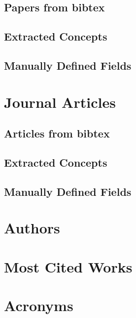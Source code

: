 \documentclass[a4paper]{article}
\begin{document}
\clearpage
\subsection{Papers from bibtex}


\clearpage
\subsection{Extracted Concepts}


\clearpage
\subsection{Manually Defined Fields}


\clearpage
\section{Journal Articles}

\clearpage
\subsection{Articles from bibtex}



\clearpage
\subsection{Extracted Concepts}


\clearpage
\subsection{Manually Defined Fields}


\clearpage
\section{Authors}



\clearpage
\section{Most Cited Works}




\clearpage
\section{Acronyms}
\end{document}
